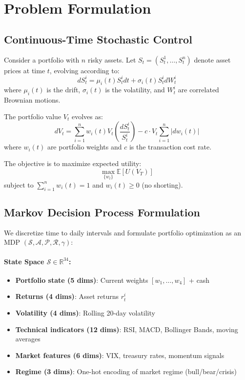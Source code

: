 \documentclass[12pt]{article}
\begin{document}
\section{Problem Formulation}

\subsection{Continuous-Time Stochastic Control}

Consider a portfolio with $n$ risky assets. Let $S_t = (S_t^1, \ldots, S_t^n)$ denote asset prices at time $t$, evolving according to:
\begin{equation}
    dS_t^i = \mu_i(t) S_t^i dt + \sigma_i(t) S_t^i dW_t^i
\end{equation}
where $\mu_i(t)$ is the drift, $\sigma_i(t)$ is the volatility, and $W_t^i$ are correlated Brownian motions.

The portfolio value $V_t$ evolves as:
\begin{equation}
    dV_t = \sum_{i=1}^n w_i(t) V_t \left( \frac{dS_t^i}{S_t^i} \right) - c \cdot V_t \sum_{i=1}^n |dw_i(t)|
\end{equation}
where $w_i(t)$ are portfolio weights and $c$ is the transaction cost rate.

The objective is to maximize expected utility:
\begin{equation}
    \max_{\{w_t\}} \mathbb{E}\left[ U(V_T) \right]
\end{equation}
subject to $\sum_{i=1}^n w_i(t) = 1$ and $w_i(t) \geq 0$ (no shorting).

\subsection{Markov Decision Process Formulation}

We discretize time to daily intervals and formulate portfolio optimization as an MDP $(\mathcal{S}, \mathcal{A}, \mathcal{P}, \mathcal{R}, \gamma)$:

\paragraph{State Space $\mathcal{S} \in \mathbb{R}^{34}$:}
\begin{itemize}
    \item \textbf{Portfolio state (5 dims)}: Current weights $[w_1, \ldots, w_4]$ + cash
    \item \textbf{Returns (4 dims)}: Asset returns $r_t^i$
    \item \textbf{Volatility (4 dims)}: Rolling 20-day volatility
    \item \textbf{Technical indicators (12 dims)}: RSI, MACD, Bollinger Bands, moving averages
    \item \textbf{Market features (6 dims)}: VIX, treasury rates, momentum signals
    \item \textbf{Regime (3 dims)}: One-hot encoding of market regime (bull/bear/crisis)
\end{itemize}
\end{document}
